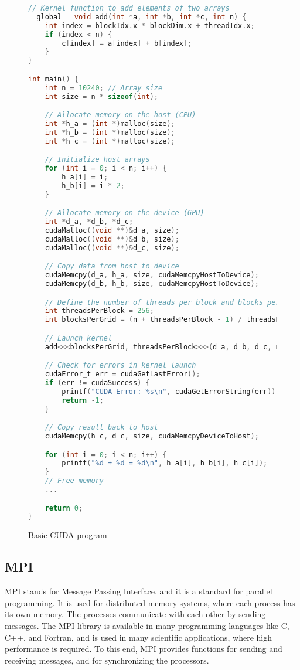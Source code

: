 \documentclass[../../main.tex]{subfiles}
\begin{document}
\begin{figure}[h]
\vspace{-5em}
\begin{lstlisting}[language=C, basicstyle=\ttfamily\small]
// Kernel function to add elements of two arrays
__global__ void add(int *a, int *b, int *c, int n) {
    int index = blockIdx.x * blockDim.x + threadIdx.x;
    if (index < n) {
        c[index] = a[index] + b[index];
    }
}

int main() {
    int n = 10240; // Array size
    int size = n * sizeof(int);

    // Allocate memory on the host (CPU)
    int *h_a = (int *)malloc(size);
    int *h_b = (int *)malloc(size);
    int *h_c = (int *)malloc(size);

    // Initialize host arrays
    for (int i = 0; i < n; i++) {
        h_a[i] = i;
        h_b[i] = i * 2;
    }

    // Allocate memory on the device (GPU)
    int *d_a, *d_b, *d_c;
    cudaMalloc((void **)&d_a, size);
    cudaMalloc((void **)&d_b, size);
    cudaMalloc((void **)&d_c, size);

    // Copy data from host to device
    cudaMemcpy(d_a, h_a, size, cudaMemcpyHostToDevice);
    cudaMemcpy(d_b, h_b, size, cudaMemcpyHostToDevice);

    // Define the number of threads per block and blocks per grid
    int threadsPerBlock = 256;
    int blocksPerGrid = (n + threadsPerBlock - 1) / threadsPerBlock;

    // Launch kernel
    add<<<blocksPerGrid, threadsPerBlock>>>(d_a, d_b, d_c, n);

    // Check for errors in kernel launch
    cudaError_t err = cudaGetLastError();
    if (err != cudaSuccess) {
        printf("CUDA Error: %s\n", cudaGetErrorString(err));
        return -1;
    }

    // Copy result back to host
    cudaMemcpy(h_c, d_c, size, cudaMemcpyDeviceToHost);

    for (int i = 0; i < n; i++) {
        printf("%d + %d = %d\n", h_a[i], h_b[i], h_c[i]);
    }
    // Free memory
    ...

    return 0;
}
\end{lstlisting}
    \caption{Basic CUDA program}
    \label{fig:cuda}
\end{figure}




\bigskip
\subsection{MPI}
MPI stands for Message Passing Interface, and it is a standard for parallel programming. It is used for distributed memory systems, where each process has its own memory. The processes communicate with each other by sending messages. The MPI library is available in many programming languages like C, C++, and Fortran, and is used in many scientific applications, where high performance is required. To this end, MPI provides functions for sending and receiving messages, and for synchronizing the processors. 
\end{document}
